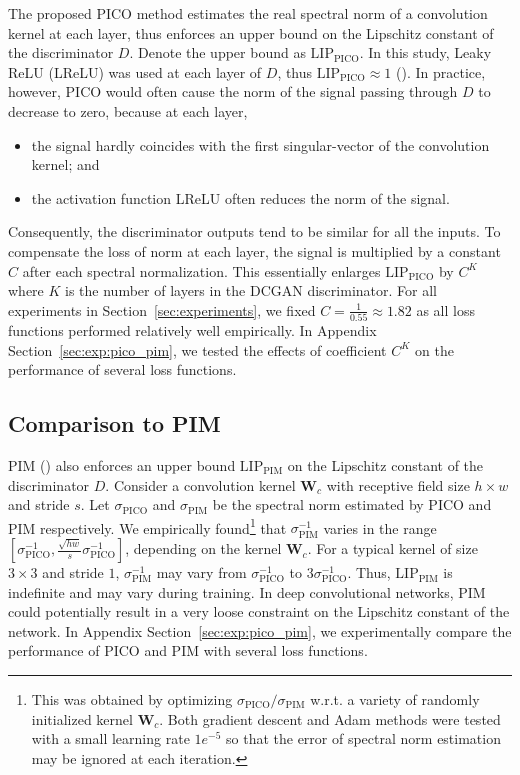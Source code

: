 \documentclass{article} %
\theoremstyle{plain}
\newtheorem*{proposition 1*}{Proposition 1}
\begin{document}
\begin{appendices}
The proposed PICO method estimates the real spectral norm of a convolution kernel at each layer, thus enforces an upper bound on the Lipschitz constant of the discriminator \(D\). Denote the upper bound as \(\text{LIP}_{\text{PICO}}\). In this study, Leaky ReLU (LReLU) was used at each layer of \(D\), thus \(\text{LIP}_{\text{PICO}}\approx1\) (\cite{pico_similar2}). In practice, however, PICO would often cause the norm of the signal passing through \(D\) to decrease to zero, because at each layer,
\begin{itemize}[leftmargin=*]
	\item the signal hardly coincides with the first singular-vector of the convolution kernel; and
	\item the activation function LReLU often reduces the norm of the signal.
\end{itemize}
Consequently, the discriminator outputs tend to be similar for all the inputs. To compensate the loss of norm at each layer, the signal is multiplied by a constant \(C\) after each spectral normalization. This essentially enlarges \(\text{LIP}_{\text{PICO}}\) by \(C^K\) where \(K\) is the number of layers in the DCGAN discriminator. For all experiments in Section~\ref{sec:experiments}, we fixed \(C=\frac{1}{0.55}\approx1.82\) as all loss functions performed relatively well empirically. In Appendix Section~\ref{sec:exp:pico_pim}, we tested the effects of coefficient \(C^K\) on the performance of several loss functions.

\subsection{Comparison to PIM}
\label{sec:compare_pim}
PIM (\cite{spectral}) also enforces an upper bound \(\text{LIP}_{\text{PIM}}\) on the Lipschitz constant of the discriminator \(D\). Consider a convolution kernel \(\bm{W}_{c}\) with receptive field size \(h\times w\) and stride \(s\). Let \(\sigma_{\text{PICO}}\) and \(\sigma_{\text{PIM}}\) be the spectral norm estimated by PICO and PIM respectively. We empirically found\footnote{This was obtained by optimizing \(\sigma_{\text{PICO}}/\sigma_{\text{PIM}}\) w.r.t. a variety of randomly initialized kernel \(\bm{W}_{c}\). Both gradient descent and Adam methods were tested with a small learning rate \(1e^{-5}\) so that the error of spectral norm estimation may be ignored at each iteration.} that \(\sigma_{\text{PIM}}^{-1}\) varies in the range \([\sigma_{\text{PICO}}^{-1}, \frac{\sqrt{hw}}{s}\sigma_{\text{PICO}}^{-1}]\), depending on the kernel \(\bm{W}_{c}\). For a typical kernel of size \(3\times3\) and stride \(1\), \(\sigma_{\text{PIM}}^{-1}\) may vary from \(\sigma_{\text{PICO}}^{-1}\) to \(3\sigma_{\text{PICO}}^{-1}\). Thus, \(\text{LIP}_{\text{PIM}}\) is indefinite and may vary during training. In deep convolutional networks, PIM could potentially result in a very loose constraint on the Lipschitz constant of the network. In Appendix Section~\ref{sec:exp:pico_pim}, we experimentally compare the performance of PICO and PIM with several loss functions.


\end{appendices}
\end{document}
